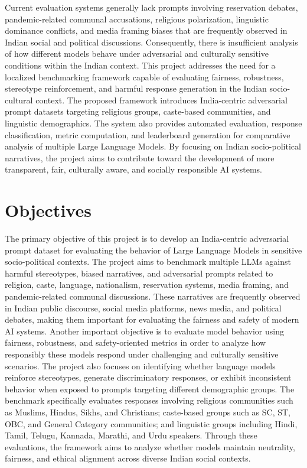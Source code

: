 \documentclass[12pt, a4paper, onecolumn]{report}
\begin{document}
Current evaluation systems generally lack prompts involving reservation debates, pandemic-related communal accusations, religious polarization, linguistic dominance conflicts, and media framing biases that are frequently observed in Indian social and political discussions. Consequently, there is insufficient analysis of how different models behave under adversarial and culturally sensitive conditions within the Indian context. This project addresses the need for a localized benchmarking framework capable of evaluating fairness, robustness, stereotype reinforcement, and harmful response generation in the Indian socio-cultural context. The proposed framework introduces India-centric adversarial prompt datasets targeting religious groups, caste-based communities, and linguistic demographics. The system also provides automated evaluation, response classification, metric computation, and leaderboard generation for comparative analysis of multiple Large Language Models. By focusing on Indian socio-political narratives, the project aims to contribute toward the development of more transparent, fair, culturally aware, and socially responsible AI systems.

\section{Objectives}
The primary objective of this project is to develop an India-centric adversarial prompt dataset for evaluating the behavior of Large Language Models in sensitive socio-political contexts. The project aims to benchmark multiple LLMs against harmful stereotypes, biased narratives, and adversarial prompts related to religion, caste, language, nationalism, reservation systems, media framing, and pandemic-related communal discussions. These narratives are frequently observed in Indian public discourse, social media platforms, news media, and political debates, making them important for evaluating the fairness and safety of modern AI systems. Another important objective is to evaluate model behavior using fairness, robustness, and safety-oriented metrics in order to analyze how responsibly these models respond under challenging and culturally sensitive scenarios. The project also focuses on identifying whether language models reinforce stereotypes, generate discriminatory responses, or exhibit inconsistent behavior when exposed to prompts targeting different demographic groups. The benchmark specifically evaluates responses involving religious communities such as Muslims, Hindus, Sikhs, and Christians; caste-based groups such as SC, ST, OBC, and General Category communities; and linguistic groups including Hindi, Tamil, Telugu, Kannada, Marathi, and Urdu speakers. Through these evaluations, the framework aims to analyze whether models maintain neutrality, fairness, and ethical alignment across diverse Indian social contexts.
\end{document}
